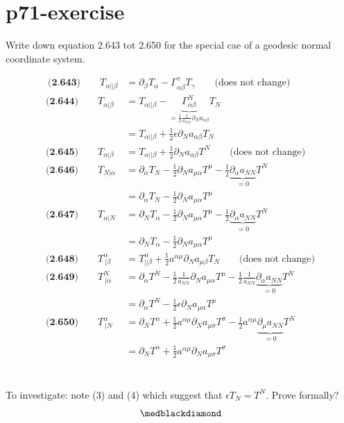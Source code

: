 \section{p71-exercise}
\begin{tcolorbox}
Write down equation 2.643 tot 2.650 for the special cae of a geodesic normal coordinate system.
\end{tcolorbox}
\begin{align}
\ \textbf{(2.643)}\quad \quad T_{\alpha || \beta} &= \partial_{\beta}T_{\alpha} - \Gamma^{\gamma}_{\alpha\beta}T_{\gamma}\quad\quad \text{(does not change)}\\
\textbf{(2.644)}\quad \quad T_{\alpha | \beta} &=T_{\alpha || \beta}  - \underbrace{\Gamma^{N}_{\alpha\beta}}_{=\frac{1}{2} \frac{1}{a_{NN}}\partial_N  a_{\alpha\beta}}T_{N}\\
&=T_{\alpha || \beta}  +\frac{1}{2} \epsilon\partial_N  a_{\alpha\beta}T_{N}\\
\textbf{(2.645)}\quad \quad T_{\alpha | \beta} &=T_{\alpha || \beta}  +\frac{1}{2}\partial_N  a_{\alpha\beta}T^{N}\quad\quad \text{(does not change)}\\
\textbf{(2.646)}\quad \quad T_{N| \alpha } &=\partial_{\alpha}T_N  -\frac{1}{2}\partial_N  a_{\mu\alpha}T^{\mu} -\frac{1}{2}\underbrace{\partial_{\alpha}  a_{NN}}_{=0}T^{N}\\
&=\partial_{\alpha}T_N  -\frac{1}{2}\partial_N  a_{\mu\alpha}T^{\mu} \\
\textbf{(2.647)}\quad \quad T_{ \alpha |N } &=\partial_N T_{\alpha}  -\frac{1}{2}\partial_N  a_{\mu\alpha}T^{\mu} -\frac{1}{2}\underbrace{\partial_{\alpha}  a_{NN}}_{=0}T^{N}\\
&=\partial_N T_{\alpha}  -\frac{1}{2}\partial_N  a_{\mu\alpha}T^{\mu} \\
\textbf{(2.648)}\quad \quad T^{\alpha}_{ \  | \beta} &=T^{\alpha}_{ || \beta}  + \frac{1}{2}a^{\alpha\mu}\partial_N  a_{\mu\beta}T_{N}\quad\quad\text{(does not change)}\\
\textbf{(2.649)}\quad \quad T^N_{ \ | \alpha} &=\partial_{\alpha}T^N  -\frac{1}{2}\frac{1}{a_{NN}}\partial_N  a_{\mu\alpha}T^{\mu} -\frac{1}{2}\frac{1}{a_{NN}}\underbrace{\partial_{\alpha}  a_{NN}}_{=0}T^{N}\\
\ &= \partial_{\alpha}T^N  -\frac{1}{2}\epsilon\partial_N  a_{\mu\alpha}T^{\mu} \\
\textbf{(2.650)}\quad \quad T^{\alpha}_{\ |N} &=\partial_N T^{\alpha}  +\frac{1}{2}a^ {\alpha\mu}\partial_N  a_{\mu\sigma}T^{\sigma} -\frac{1}{2}a^{\alpha\mu}\underbrace{\partial_{\mu}  a_{NN}}_{=0}T^{N}\\
\ &=\partial_N T^{\alpha}  +\frac{1}{2}a^ {\alpha\mu}\partial_N  a_{\mu\sigma}T^{\sigma} 
\end{align}
\\\\
To investigate: note (3) and (4) which suggest that $\epsilon T_{N} = T^{N}$. Prove formally?
$$\medblackdiamond$$
\newpage


